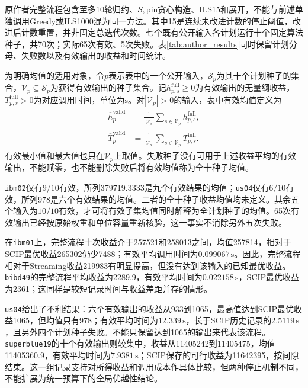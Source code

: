 原作者完整流程包含至多10轮归约、$S,\mathrm{pin}$贪心构造、ILS15和展开，不能与前述单独调用Greedy或ILS1000混为同一方法\cite{GrossmannJRS2026}。其中15是连续未改进计数的停止阈值，改进后计数重置，并非固定总迭代次数。七个既有公开输入各计划运行十个固定算法种子，共70次；实际65次有效、5次失败。表\ref{tab:author_results}同时保留计划分母、失败数以及有效输出的收益和时间统计。



为明确均值的适用对象，令$p$表示表中的一个公开输入，$\mathcal S_p$为其十个计划种子的集合，$\mathcal V_p\subseteq\mathcal S_p$为获得有效输出的种子集合。记$h^{\mathrm{full}}_{p,s}\geq0$为有效输出的无量纲收益，$T^{\mathrm{full}}_{p,s}>0$为对应调用时间，单位为$\mathrm{s}$。对$|\mathcal V_p|>0$的输入，表中有效均值定义为
\begin{align}
 \overline h^{\mathrm{valid}}_p
 &=\frac{1}{|\mathcal V_p|}
   \sum_{s\in\mathcal V_p}h^{\mathrm{full}}_{p,s},
 \label{s0307:author_quality_mean}\\
 \overline T^{\mathrm{valid}}_p
 &=\frac{1}{|\mathcal V_p|}
   \sum_{s\in\mathcal V_p}T^{\mathrm{full}}_{p,s}.
 \label{s0307:author_time_mean}
\end{align}
有效最小值和最大值也只在$\mathcal V_p$上取值。失败种子没有可用于上述收益平均的有效输出，不能赋零，也不能删除失败后将有效均值称为全十种子均值。

\texttt{ibm02}仅有$9/10$有效，所列379719.3333是九个有效结果的均值；\texttt{us04}仅有$6/10$有效，所列978是六个有效结果的均值。二者的全十种子收益均值均未定义。其余五个输入为$10/10$有效，才可将有效子集均值同时解释为全计划种子的均值。65次有效输出已经按原始权重和单位容量重新核验，这一事实不消除另外五次失败。

在\texttt{ibm01}上，完整流程十次收益介于257521和258013之间，均值257814，相对于SCIP最优收益265302仍少7488；有效平均调用时间为$0.099067\,\mathrm{s}$。因此，完整流程相对于Streaming收益219983有明显提高，但没有达到该输入的已知最优收益。\texttt{bibd49}的完整流程平均收益为2289.9，有效平均时间为$0.022158\,\mathrm{s}$，SCIP最优收益为2361；这同样是较短记录时间与收益差距并存的情形。

\texttt{us04}给出了不利结果：六个有效输出的收益从933到1065，最高值达到SCIP最优收益1065，但均值只有978；有效平均时间为$12.339\,\mathrm{s}$，长于SCIP历史记录的$2.5119\,\mathrm{s}$，且另外四个计划种子失败。不能只保留达到1065的输出来代表该流程。\texttt{superblue19}的十个有效输出则较集中，收益从11405242到11405475，均值11405360.9，有效平均时间为$7.9381\,\mathrm{s}$；SCIP保存的可行收益为11642395，按间隙结束。这一组记录支持对所得收益和调用成本作具体比较，但两种停止机制不同，不能扩展为统一预算下的全局优越性结论。

